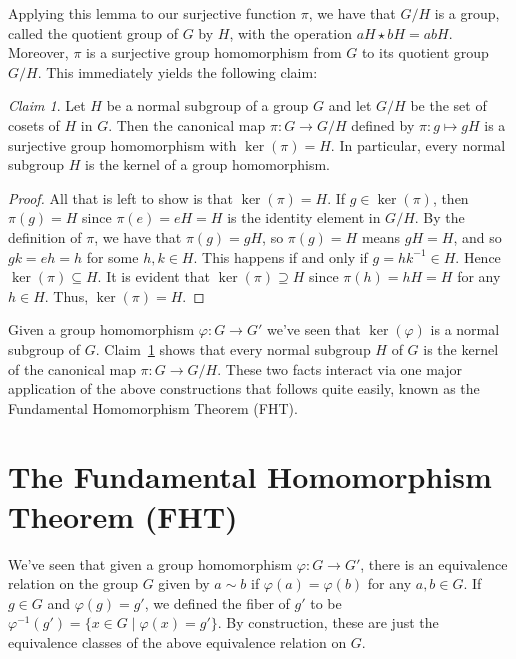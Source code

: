 \documentclass[12pt,letterpaper,DIV=11,final]{scrartcl}
\theoremstyle{plain}
\theoremstyle{definition}
\theoremstyle{remark}
\newtheorem{claim}{Claim}
\begin{document}
Applying this lemma to our surjective function $\pi$, we have that $G/H$ is a group, called the quotient group of $G$ by $H$, with the operation $aH \star bH = abH$.
Moreover, $\pi$ is a surjective group homomorphism from $G$ to its quotient group $G/H$.
This immediately yields the following claim:

\begin{claim}\label{claim:canonicalmap_homomorphism}
  Let $H$ be a normal subgroup of a group $G$ and let $G/H$ be the set of cosets of $H$ in $G$.
  Then the canonical map $\pi : G \to G/H$ defined by $\pi : g \mapsto gH$ is a surjective group homomorphism with $\ker(\pi) = H$.
  In particular, every normal subgroup $H$ is the kernel of a group homomorphism.

  \begin{proof}
    All that is left to show is that $\ker(\pi) = H$.
    If $g \in \ker(\pi)$, then $\pi(g) = H$ since $\pi(e) = eH = H$ is the identity element in $G/H$.
    By the definition of $\pi$, we have that $\pi(g) = gH$, so $\pi(g) = H$ means $gH = H$, and so $gk = eh = h$ for some $h, k \in H$.
    This happens if and only if $g = hk^{-1} \in H$.
    Hence $\ker(\pi) \subseteq H$.
    It is evident that $\ker(\pi) \supseteq H$ since $\pi(h) = hH = H$ for any $h \in H$.
    Thus, $\ker(\pi) = H$.
  \end{proof}
\end{claim}

Given a group homomorphism $\varphi: G \to G'$ we've seen that $\ker(\varphi)$ is a normal subgroup of $G$.
Claim~\ref{claim:canonicalmap_homomorphism} shows that every normal subgroup $H$ of $G$ is the kernel of the canonical map $\pi : G \to G/H$.
These two facts interact via one major application of the above constructions that follows quite easily, known as the Fundamental Homomorphism Theorem (FHT).

\section{The Fundamental Homomorphism Theorem (FHT)}

We've seen that given a group homomorphism $\varphi : G \to G'$, there is an equivalence relation on the group $G$ given by $a \sim b$ if $\varphi(a) = \varphi(b)$ for any $a, b \in G$.
If $g \in G$ and $\varphi(g) = g'$, we defined the fiber of $g'$ to be $\varphi^{-1}(g') = \{ x \in G \mid \varphi(x) = g' \}$.
By construction, these are just the equivalence classes of the above equivalence relation on $G$.
\end{document}
